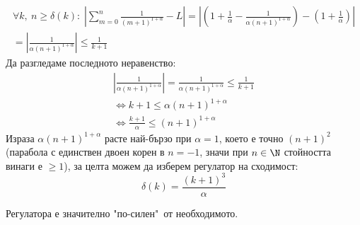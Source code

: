 \begin{solution}
\begin{equation}
        \begin{split}
            \forall k,\ n \geq \delta(k):\; \left| \sum\limits_{m=0}^n \frac{1}{(m+1)^{1 + \alpha}} - L \right| = \left|\left(1 + \frac{1}{\alpha} - \frac{1}{\alpha(n+1)^{1 + \alpha}}\right) - \left(1 + \frac{1}{\alpha}\right)\right| \\
            = \left|\frac{1}{\alpha(n+1)^{1+\alpha}}\right| \leq \frac{1}{k+1}
        \end{split}
     \end{equation}
     Да разгледаме последното неравенство:
     \begin{equation}
        \begin{split}
             \left|\frac{1}{\alpha(n+1)^{1+\alpha}}\right| = \frac{1}{\alpha(n+1)^{1+\alpha}} \leq \frac{1}{k+1}\\
            \iff k+1 \leq \alpha(n+1)^{1+\alpha} \\
            \iff \frac{k+1}{\alpha} \leq (n+1)^{1+\alpha}
        \end{split}
     \end{equation}
     Израза $\alpha(n+1)^{1+\alpha}$ расте най-бързо при $\alpha=1$, което е точно $(n+1)^2$ (парабола с единствен двоен корен в $n=-1$, значи при $n\in\N$ стойността винаги е $\geq 1$), за целта можем да изберем регулатор на сходимост:
     \begin{equation}
         \delta(k) = \frac{(k+1)^3}{\alpha}
     \end{equation}

     \begin{remark}
         Регулатора е значително "по-силен"\ от необходимото.
     \end{remark}
\end{solution}